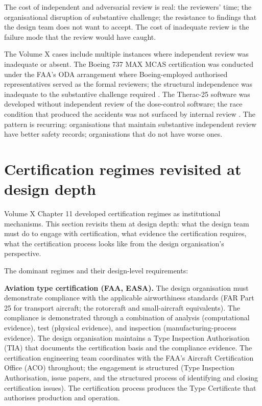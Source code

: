 The cost of independent and adversarial review is real: the reviewers' time; the organisational disruption of substantive challenge; the resistance to findings that the design team does not want to accept. The cost of inadequate review is the failure mode that the review would have caught.

The Volume X cases include multiple instances where independent review was inadequate or absent. The Boeing 737 MAX MCAS certification was conducted under the FAA's ODA arrangement where Boeing-employed authorised representatives served as the formal reviewers; the structural independence was inadequate to the substantive challenge required \cite{acc:house-737max-2020}. The Therac-25 software was developed without independent review of the dose-control software; the race condition that produced the accidents was not surfaced by internal review \cite{paper:leveson-turner1993}. The pattern is recurring: organisations that maintain substantive independent review have better safety records; organisations that do not have worse ones.

\section{Certification regimes revisited at design depth}

Volume X Chapter 11 developed certification regimes as institutional mechanisms. This section revisits them at design depth: what the design team must do to engage with certification, what evidence the certification requires, what the certification process looks like from the design organisation's perspective.

The dominant regimes and their design-level requirements:

\textbf{Aviation type certification (FAA, EASA).} The design organisation must demonstrate compliance with the applicable airworthiness standards (FAR Part 25 for transport aircraft; the rotorcraft and small-aircraft equivalents). The compliance is demonstrated through a combination of analysis (computational evidence), test (physical evidence), and inspection (manufacturing-process evidence). The design organisation maintains a Type Inspection Authorisation (TIA) that documents the certification basis and the compliance evidence. The certification engineering team coordinates with the FAA's Aircraft Certification Office (ACO) throughout; the engagement is structured (Type Inspection Authorisation, issue papers, and the structured process of identifying and closing certification issues). The certification process produces the Type Certificate that authorises production and operation.


